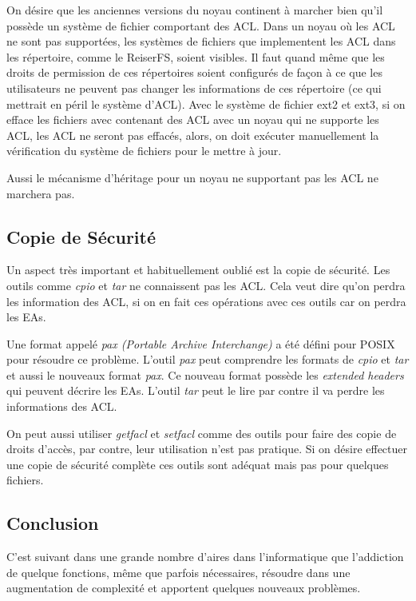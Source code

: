 On désire que les anciennes versions du noyau continent à marcher bien qu'il possède un système de fichier comportant des ACL. Dans un noyau où les ACL ne sont pas supportées, les systèmes de fichiers que implementent les ACL dans les répertoire, comme le ReiserFS, soient visibles. Il faut quand même que les droits de permission de ces répertoires soient configurés de façon à ce que les utilisateurs ne peuvent pas changer les informations de ces répertoire (ce qui mettrait en péril le système d'ACL). Avec le système de fichier ext2 et ext3, si on efface les fichiers avec contenant des ACL avec un noyau qui ne supporte les ACL, les ACL ne seront pas effacés, alors, on doit exécuter manuellement la vérification du système de fichiers pour le mettre à jour. 
 	
Aussi le mécanisme d'héritage pour un noyau ne supportant pas les ACL ne marchera pas. 

\subsection*{Copie de Sécurité}

Un aspect très important et habituellement oublié est la copie de sécurité. Les outils comme \emph{cpio} et \emph{tar} ne connaissent pas les ACL. Cela veut dire qu'on perdra les information des ACL, si on en fait ces opérations avec ces outils car on perdra les EAs.

Une format appelé \emph{pax (Portable Archive Interchange)} a été défini pour POSIX pour résoudre ce problème. L'outil \emph{pax} peut comprendre les formats de \emph{cpio} et \emph{tar} et aussi le nouveaux format \emph{pax}. Ce nouveau format possède les \emph{extended headers} qui peuvent décrire les EAs. L'outil \emph{tar} peut le lire par contre il va perdre les informations des ACL. 

On peut aussi utiliser \emph{getfacl} et \emph{setfacl} comme des outils pour faire des copie de droits d'accès, par contre, leur utilisation n'est pas pratique. Si on désire effectuer une copie de sécurité complète ces outils sont adéquat mais pas pour quelques fichiers. 

\subsection*{Conclusion}
C'est suivant dans une grande nombre d'aires dans l'informatique que l'addiction de quelque fonctions, même que parfois nécessaires, résoudre dans une augmentation de complexité et apportent quelques nouveaux problèmes. 

